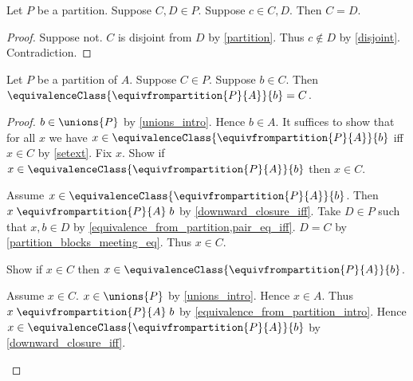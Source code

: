 \begin{lemma}\label{partition_blocks_meeting_eq}
    Let $P$ be a partition.
    Suppose $C,D\in P$.
    Suppose $c\in C,D$.
    Then $C=D$.
\end{lemma}
\begin{proof}
    Suppose not.
    $C$ is disjoint from $D$ by \cref{partition}.
    Thus $c\notin D$ by \cref{disjoint}.
    Contradiction.
\end{proof}

\begin{lemma}\label{partition_block_is_equivalence_class}
    Let $P$ be a partition of $A$.
    Suppose $C\in P$.
    Suppose $b\in C$.
    Then $\equivalenceClass{\equivfrompartition{P}{A}}{b}=C$.
\end{lemma}
\begin{proof}
    $b\in\unions{P}$ by \cref{unions_intro}.
    Hence $b\in A$.
    It suffices to show that for all $x$ we have
        $x\in\equivalenceClass{\equivfrompartition{P}{A}}{b}$ iff $x\in C$
        by \cref{setext}.
    Fix $x$.
    Show if $x\in\equivalenceClass{\equivfrompartition{P}{A}}{b}$ then $x\in C$.
    \begin{subproof}
        Assume $x\in\equivalenceClass{\equivfrompartition{P}{A}}{b}$.
        Then $x\mathrel{\equivfrompartition{P}{A}}b$
            by \cref{downward_closure_iff}.
        Take $D\in P$ such that $x,b\in D$
            by \cref{equivalence_from_partition,pair_eq_iff}.
        $D=C$ by \cref{partition_blocks_meeting_eq}.
        Thus $x\in C$.
    \end{subproof}
    Show if $x\in C$ then
        $x\in\equivalenceClass{\equivfrompartition{P}{A}}{b}$.
    \begin{subproof}
        Assume $x\in C$.
        $x\in\unions{P}$ by \cref{unions_intro}.
        Hence $x\in A$.
        Thus $x\mathrel{\equivfrompartition{P}{A}}b$
            by \cref{equivalence_from_partition_intro}.
        Hence $x\in\equivalenceClass{\equivfrompartition{P}{A}}{b}$
            by \cref{downward_closure_iff}.
    \end{subproof}
\end{proof}

